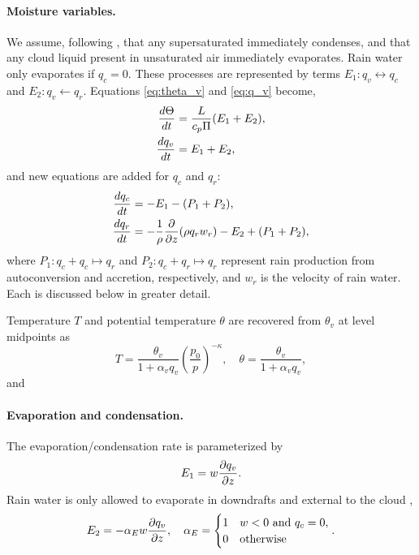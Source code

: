 \paragraph{Moisture variables.}
We assume, following \cite{SoongOgura1973,KlempWilhelmson1978}, that any supersaturated immediately condenses, and that any cloud liquid present in unsaturated air immediately evaporates.
Rain water only evaporates if $q_c = 0$.
These processes are represented by terms $E_1:q_v\leftrightarrow q_c$ and $E_2:q_v \leftarrow q_r$.
Equations \eqref{eq:theta_v} and \eqref{eq:q_v} become,
\begin{align}
  \frac{ d \Theta}{d t} &= \frac{L}{c_p \Pi }(E_1 + E_2), \\
  \frac{ d q_v}{d t} &= E_1 + E_2,
\end{align}
and new equations are added for $q_c$ and $q_r$:
\begin{align}
  \frac{ d q_c}{d t} &= -E_1 - (P_1 + P_2),\label{eq:cloud_water} \\
  \frac{ d q_r}{d t} &= -\frac{1}{\rho}\frac{\partial  }{\partial z}(\rho q_r w_r) - E_2 + (P_1 + P_2), \label{eq:rain_water}
\end{align}
where $P_1:q_c+q_c\mapsto q_r$ and $P_2:q_c+q_r\mapsto q_r$ represent rain production from autoconversion and accretion, respectively, and $w_r$ is the velocity of rain water. Each is discussed below in greater detail.

Temperature $T$ and potential temperature $\theta$ are recovered from $\theta_v$ at level midpoints as
\begin{equation}\label{eq:temperature}
  T = \frac{\theta_v}{1+\alpha_v q_v} \left(\frac{p_0}{p}\right)^{-\kappa}, \quad \theta = \frac{\theta_v}{1+\alpha_vq_v},
\end{equation}
and 

  
\paragraph{Evaporation and condensation.}
The evaporation/condensation rate is parameterized by \cite[eqn.~(5)]{Srivastava1967}
\begin{equation}\label{eq:evap_param}
  E_1 = w\frac{\partial q_v }{\partial z}.
\end{equation}
Rain water is only allowed to evaporate in downdrafts and external to the cloud  \cite[eqn.~(10)]{Srivastava1967},
\begin{equation}\label{eq:rain_evap_param}
  E_2 = -\alpha_E w \frac{\partial q_v }{\partial z}, \quad \alpha_E = \begin{cases} 1 & w<0 \text{ and } q_c = 0,\\
 0 & \text{otherwise}  
 \end{cases}.
\end{equation}

